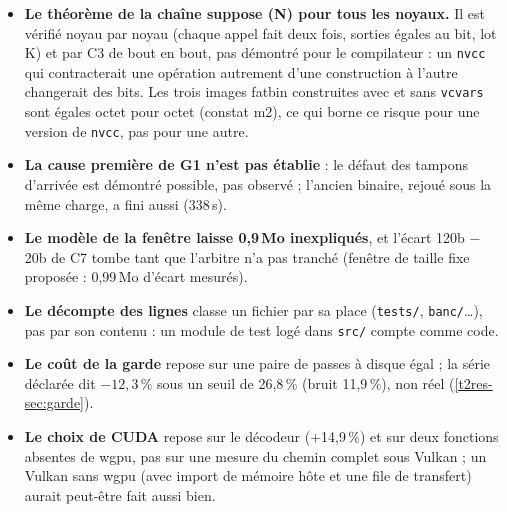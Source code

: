 \begin{faux}
\begin{itemize}
\item \textbf{Le théorème de la chaîne suppose (N) pour tous les noyaux.} Il est vérifié noyau par noyau (chaque appel fait deux fois, sorties égales au bit, lot K) et par C3 de bout en bout, pas démontré pour le compilateur : un \texttt{nvcc} qui contracterait une opération autrement d'une construction à l'autre changerait des bits. Les trois images fatbin construites avec et sans \texttt{vcvars} sont égales octet pour octet (constat m2), ce qui borne ce risque pour une version de \texttt{nvcc}, pas pour une autre.
\item \textbf{La cause première de G1 n'est pas établie} : le défaut des tampons d'arrivée est démontré possible, pas observé ; l'ancien binaire, rejoué sous la même charge, a fini aussi (338\,s).
\item \textbf{Le modèle de la fenêtre laisse 0,9\,Mo inexpliqués}, et l'écart 120b $-$ 20b de C7 tombe tant que l'arbitre n'a pas tranché (fenêtre de taille fixe proposée : 0,99\,Mo d'écart mesurés).
\item \textbf{Le décompte des lignes} classe un fichier par sa place (\texttt{tests/}, \texttt{banc/}…), pas par son contenu : un module de test logé dans \texttt{src/} compte comme code.
\item \textbf{Le coût de la garde} repose sur une paire de passes à disque égal ; la série déclarée dit $-12{,}3\,\%$ sous un seuil de 26,8\,\% (bruit 11,9\,\%), non réel (\cref{t2res-sec:garde}).
\item \textbf{Le choix de CUDA} repose sur le décodeur (+14,9\,\%) et sur deux fonctions absentes de wgpu, pas sur une mesure du chemin complet sous Vulkan ; un Vulkan sans wgpu (avec import de mémoire hôte et une file de transfert) aurait peut-être fait aussi bien.
\end{itemize}
\end{faux}
